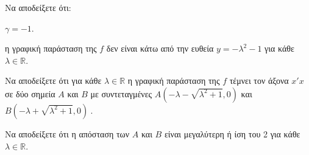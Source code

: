 \begin{alist}
\item Να αποδείξετε ότι:
\begin{rlist}
\item $\gamma = - 1$. 
\item
  η γραφική παράσταση της $f$ δεν είναι κάτω από την ευθεία $y = - \lambda^{2} - 1$ για κάθε $\lambda\mathbb{\in R}$. 
\end{rlist}
\item Να αποδείξετε ότι για κάθε $\lambda\mathbb{\in R}$ η γραφική παράσταση της $f$ τέμνει τον άξονα $x'x$ σε δύο σημεία $A$ και $B$ με συντεταγμένες $A\left( - \lambda - \sqrt{\lambda^{2} + 1},0 \right)$ και $B\left( - \lambda + \sqrt{\lambda^{2} + 1},0 \right)\ $.
\item Να αποδείξετε ότι η απόσταση των $A$ και $B$ είναι μεγαλύτερη ή ίση του 2 για κάθε $\lambda\mathbb{\in R}$.
\end{alist}

